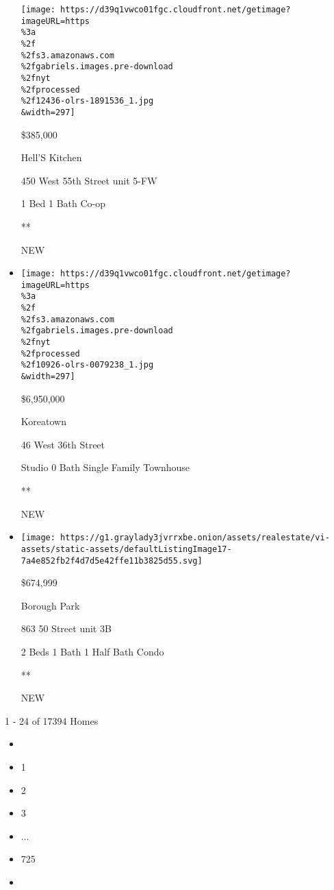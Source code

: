 \begin{itemize}
  \texttt{[image: https://d39q1vwco01fgc.cloudfront.net/getimage?imageURL=https\\\%3a\\\%2f\\\%2fs3.amazonaws.com\\\%2fgabriels.images.pre-download\\\%2fnyt\\\%2fprocessed\\\%2f12436-olrs-1891536\_1.jpg\\\&width=297]}

  \$385,000

  Hell'S Kitchen

  450 West 55th Street unit 5-FW

  1 Bed \textbar{} 1 Bath \textbar{} Co-op

  **

  NEW
\item
  \href{/real-estate/usa/ny/new-york/koreatown/homes-for-sale/46-west-36th-street/10926-OLRS-0079238?}{}

  \texttt{[image: https://d39q1vwco01fgc.cloudfront.net/getimage?imageURL=https\\\%3a\\\%2f\\\%2fs3.amazonaws.com\\\%2fgabriels.images.pre-download\\\%2fnyt\\\%2fprocessed\\\%2f10926-olrs-0079238\_1.jpg\\\&width=297]}

  \$6,950,000

  Koreatown

  46 West 36th Street

  Studio \textbar{} 0 Bath \textbar{} Single Family Townhouse

  **

  NEW
\item
  \href{/real-estate/usa/ny/brooklyn/borough-park/homes-for-sale/863-50-street/15091-5522733?}{}

  \texttt{[image: https://g1.graylady3jvrrxbe.onion/assets/realestate/vi-assets/static-assets/defaultListingImage17-7a4e852fb2f4d7d5e42ffe11b3825d55.svg]}

  \$674,999

  Borough Park

  863 50 Street unit 3B

  2 Beds \textbar{} 1 Bath \textbar{} 1 Half Bath \textbar{} Condo

  **

  NEW
\end{itemize}

1 - 24 of 17394 Homes

\begin{itemize}
\item
\item
  1
\item
  2
\item
  3
\item
  ...
\item
  725
\item
\end{itemize}

